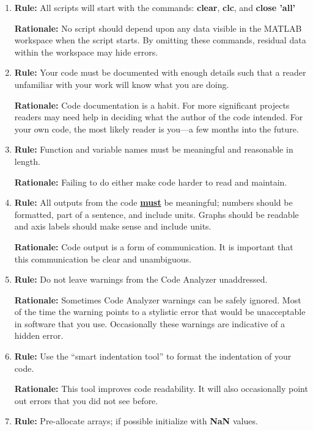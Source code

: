 \documentclass{tufte-book}
\theoremstyle{break}
\begin{document}
\begin{enumerate}
\item \textbf{Rule:} All scripts will start with the commands: \textbf{clear}, \textbf{clc}, and \textbf{close 'all'}

\textbf{Rationale:} No script should depend upon any data visible in the MATLAB workspace when the script starts.  By omitting these commands, residual data within the workspace may hide errors.

\item \textbf{Rule:} Your code must be documented with enough details such that a reader unfamiliar with your work will know what you are doing.

\textbf{Rationale:} Code documentation is a habit. For more significant projects readers may need help in deciding what the author of the code intended.  For your own code, the most likely reader is you---a few months into the future.

\item \textbf{Rule:} Function and variable names must be meaningful and reasonable in length.

\textbf{Rationale:} Failing to do either make code harder to read and maintain.

\item \textbf{Rule:} All outputs from the code \underline{\textbf{must}} be meaningful; numbers should be formatted, part of a sentence, and include units. Graphs should be readable and axis labels should make sense and include units.

\textbf{Rationale:} Code output is a form of communication. It is important that this communication be clear and unambiguous.

\item \textbf{Rule:} Do not leave warnings from the Code Analyzer unaddressed.

\textbf{Rationale:} Sometimes Code Analyzer warnings can be safely ignored.  Most of the time the warning points to a stylistic error that would be unacceptable in software that you use. Occasionally these warnings are indicative of a hidden error.

\item \textbf{Rule:} Use the ``smart indentation tool'' to format the indentation of your code.

\textbf{Rationale:} This tool improves code readability. It will also occasionally point out errors that you did not see before.

\item \textbf{Rule:} Pre-allocate arrays; if possible initialize with \textbf{NaN} values.


\end{enumerate}
\end{document}
